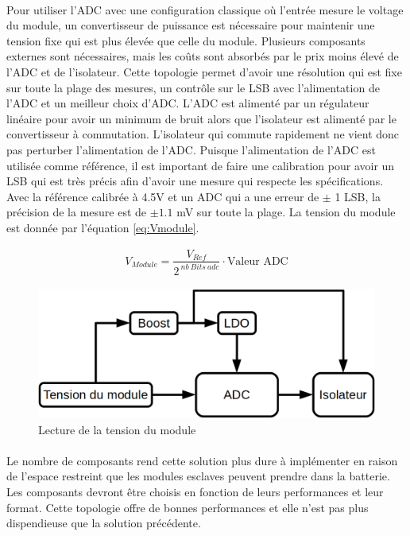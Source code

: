	\paragraph*{}
	Pour utiliser l'ADC avec une configuration classique où l'entrée mesure le voltage du module, un convertisseur de puissance est nécessaire pour maintenir une tension fixe qui est plus élevée que celle du module. Plusieurs composants externes sont nécessaires, mais les coûts sont absorbés par le prix moins élevé de l'ADC et de l'isolateur. Cette topologie permet d'avoir une résolution qui est fixe sur toute la plage des mesures, un contrôle sur le LSB avec l'alimentation de l'ADC et un meilleur choix d'ADC. L'ADC est alimenté par un régulateur linéaire pour avoir un minimum de bruit alors que l'isolateur est alimenté par le convertisseur à commutation. L'isolateur qui commute rapidement ne vient donc pas perturber l'alimentation de l'ADC. Puisque l'alimentation de l'ADC  est utilisée comme référence, il est important de faire une calibration pour avoir un LSB qui est très précis afin d'avoir une mesure qui respecte les spécifications. Avec la référence calibrée à 4.5V et un ADC qui a une erreur de $\pm$ 1 LSB, la précision de la mesure est de $\pm 1.1$ mV sur toute la plage. La tension du module est donnée par l'équation \ref{eq:Vmodule}.

	\begin{align}
		V_{Module} = \dfrac{V_{Ref}}{2^{~nb~Bits~adc}} \cdot \text{Valeur ADC}
		\label{eq:Vmodule}
	\end{align}

	\begin{figure}[H]
		\centering
		\includegraphics[scale=0.3]{Images/Tension_module.png}
		\caption{Lecture de la tension du module}
		\label{fig:adc_vmod}
	\end{figure}

	\paragraph*{}
	Le nombre de composants rend cette solution plus dure à implémenter en raison de l'espace restreint que les modules esclaves peuvent prendre dans la batterie. Les composants devront être choisis en fonction de leurs performances et leur format. Cette topologie offre de bonnes performances et elle n'est pas plus dispendieuse que la solution précédente.

